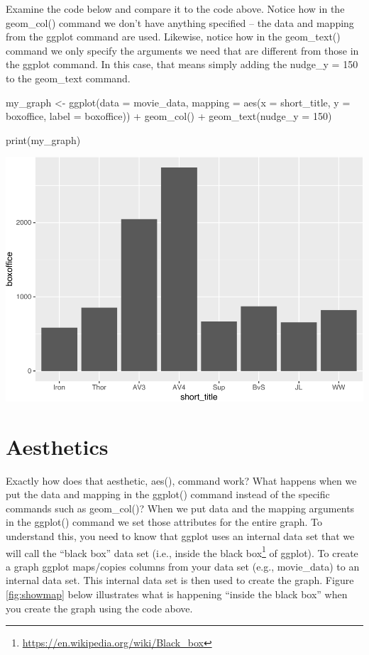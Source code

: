 \documentclass[
]{krantz}
\makeatletter
\newenvironment{Shaded}{\begin{snugshade}}{\end{snugshade}}
\newcommand{\AttributeTok}[1]{\textcolor[rgb]{0.61,0.61,0.61}{#1}}
\newcommand{\DecValTok}[1]{\textcolor[rgb]{0.06,0.06,0.06}{#1}}
\newcommand{\FunctionTok}[1]{\textcolor[rgb]{0,0,0}{#1}}
\newcommand{\NormalTok}[1]{#1}
\newcommand{\OtherTok}[1]{\textcolor[rgb]{0.37,0.37,0.37}{#1}}
\newcommand{\SpecialCharTok}[1]{\textcolor[rgb]{0,0,0}{#1}}
\renewcommand{\href}[2]{#2\footnote{\url{#1}}}
\newenvironment{kframe}{%
\medskip{}
\setlength{\fboxsep}{.8em}
 \def\at@end@of@kframe{}%
 \ifinner\ifhmode%
  \def\at@end@of@kframe{\end{minipage}}%
  \begin{minipage}{\columnwidth}%
 \fi\fi%
 \def\FrameCommand##1{\hskip\@totalleftmargin \hskip-\fboxsep
 \colorbox{shadecolor}{##1}\hskip-\fboxsep
     \hskip-\linewidth \hskip-\@totalleftmargin \hskip\columnwidth}%
 \MakeFramed {\advance\hsize-\width
   \@totalleftmargin\z@ \linewidth\hsize
   \@setminipage}}%
 {\par\unskip\endMakeFramed%
 \at@end@of@kframe}
\renewenvironment{Shaded}{\begin{kframe}}{\end{kframe}}
\makeatother
\begin{document}
Examine the code below and compare it to the code above. Notice how in the geom\_col() command we don't have anything specified -- the data and mapping from the ggplot command are used. Likewise, notice how in the geom\_text() command we only specify the arguments we need that are different from those in the ggplot command. In this case, that means simply adding the nudge\_y = 150 to the geom\_text command.

\begin{Shaded}
\begin{Highlighting}[]
\NormalTok{my\_graph }\OtherTok{\textless{}{-}} \FunctionTok{ggplot}\NormalTok{(}\AttributeTok{data =}\NormalTok{ movie\_data,}
           \AttributeTok{mapping =} \FunctionTok{aes}\NormalTok{(}\AttributeTok{x =}\NormalTok{ short\_title,}
                         \AttributeTok{y =}\NormalTok{ boxoffice,}
                         \AttributeTok{label =}\NormalTok{ boxoffice)) }\SpecialCharTok{+}
  \FunctionTok{geom\_col}\NormalTok{() }\SpecialCharTok{+}
  \FunctionTok{geom\_text}\NormalTok{(}\AttributeTok{nudge\_y =} \DecValTok{150}\NormalTok{) }

\FunctionTok{print}\NormalTok{(my\_graph)}
\end{Highlighting}
\end{Shaded}

\includegraphics[width=0.65\linewidth]{bookdown_files/figure-latex/unnamed-chunk-109-1}

\hypertarget{aesthetics}{%
\section{Aesthetics}\label{aesthetics}}

Exactly how does that aesthetic, aes(), command work? What happens when we put the data and mapping in the ggplot() command instead of the specific commands such as geom\_col()? When we put data and the mapping arguments in the ggplot() command we set those attributes for the entire graph. To understand this, you need to know that ggplot uses an internal data set that we will call the ``black box'' data set (i.e., inside the \href{https://en.wikipedia.org/wiki/Black_box}{black box} of ggplot). To create a graph ggplot maps/copies columns from your data set (e.g., movie\_data) to an internal data set. This internal data set is then used to create the graph. Figure \ref{fig:showmap} below illustrates what is happening ``inside the black box'' when you create the graph using the code above.
\end{document}

